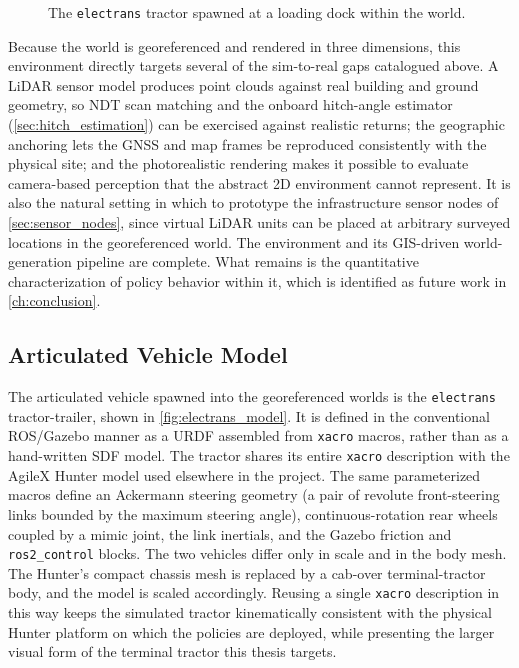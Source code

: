 \begin{figure}[H]
        \centering
        \caption{The \texttt{electrans} tractor spawned at a loading dock within the world.}
        \label{fig:geo_sim_gazebo_vehicle}
\end{figure}

Because the world is georeferenced and rendered in three dimensions, this environment directly targets several of the sim-to-real gaps catalogued above. A LiDAR sensor model produces point clouds against real building and ground geometry, so NDT scan matching and the onboard hitch-angle estimator (\cref{sec:hitch_estimation}) can be exercised against realistic returns; the geographic anchoring lets the GNSS and map frames be reproduced consistently with the physical site; and the photorealistic rendering makes it possible to evaluate camera-based perception that the abstract 2D environment cannot represent. It is also the natural setting in which to prototype the infrastructure sensor nodes of \cref{sec:sensor_nodes}, since virtual LiDAR units can be placed at arbitrary surveyed locations in the georeferenced world. The environment and its GIS-driven world-generation pipeline are complete. What remains is the quantitative characterization of policy behavior within it, which is identified as future work in \cref{ch:conclusion}.

\subsection{Articulated Vehicle Model}
\label{sec:electrans_model}

The articulated vehicle spawned into the georeferenced worlds is the \texttt{electrans} tractor-trailer, shown in \cref{fig:electrans_model}. It is defined in the conventional ROS/Gazebo manner as a URDF assembled from \texttt{xacro} macros, rather than as a hand-written SDF model. The tractor shares its entire \texttt{xacro} description with the AgileX Hunter model used elsewhere in the project. The same parameterized macros define an Ackermann steering geometry (a pair of revolute front-steering links bounded by the maximum steering angle), continuous-rotation rear wheels coupled by a mimic joint, the link inertials, and the Gazebo friction and \texttt{ros2\_control} blocks. The two vehicles differ only in scale and in the body mesh. The Hunter's compact chassis mesh is replaced by a cab-over terminal-tractor body, and the model is scaled accordingly. Reusing a single \texttt{xacro} description in this way keeps the simulated tractor kinematically consistent with the physical Hunter platform on which the policies are deployed, while presenting the larger visual form of the terminal tractor this thesis targets.

